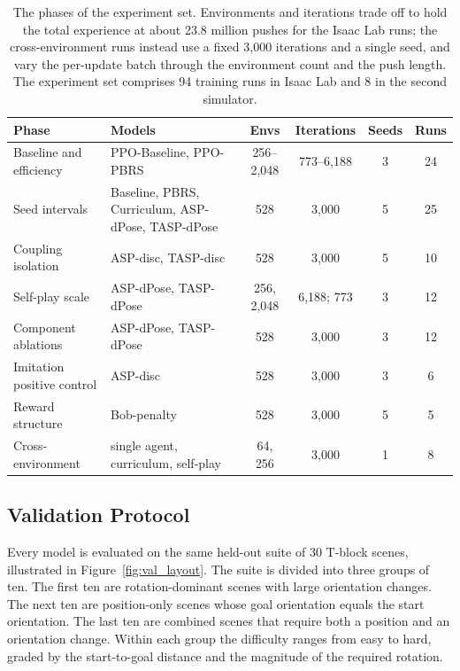 \begin{table}[H]
    \centering
    \small
    \begin{tabularx}{\textwidth}{l X c c c c}
        \hline
        \textbf{Phase} & \textbf{Models} & \textbf{Envs} & \textbf{Iterations} &
        \textbf{Seeds} & \textbf{Runs} \\
        \hline
        Baseline and efficiency & PPO-Baseline, PPO-PBRS & 256--2{,}048 &
        773--6{,}188 & 3 & 24 \\
        Seed intervals & Baseline, PBRS, Curriculum, ASP-dPose, TASP-dPose & 528 &
        3{,}000 & 5 & 25 \\
        Coupling isolation & ASP-disc, TASP-disc & 528 & 3{,}000 & 5 & 10 \\
        Self-play scale & ASP-dPose, TASP-dPose & 256, 2{,}048 & 6{,}188; 773 & 3 &
        12 \\
        Component ablations & ASP-dPose, TASP-dPose & 528 & 3{,}000 & 3 & 12 \\
        Imitation positive control & ASP-disc & 528 & 3{,}000 & 3 & 6 \\
        Reward structure & Bob-penalty & 528 & 3{,}000 & 5 & 5 \\
        Cross-environment & single agent, curriculum, self-play & 64, 256 &
        3{,}000 & 1 & 8 \\
        \hline
    \end{tabularx}
    \caption{The phases of the experiment set. Environments and iterations trade
    off to hold the total experience at about 23.8 million pushes for the Isaac Lab
    runs; the cross-environment runs instead use a fixed 3{,}000 iterations and a
    single seed, and vary the per-update batch through the environment count and
    the push length. The experiment set comprises 94 training runs in Isaac Lab and
    8 in the second simulator.}
    \label{tab:phases}
\end{table}

\subsection{Validation Protocol}
\label{sec:val_protocol}

Every model is evaluated on the same held-out suite of 30 T-block scenes,
illustrated in Figure~\ref{fig:val_layout}. The suite is divided into three groups
of ten. The first ten are rotation-dominant scenes with large orientation
changes. The next ten are position-only scenes whose goal orientation equals the
start orientation. The last ten are combined scenes that require both a position
and an orientation change. Within each group the difficulty ranges from easy to
hard, graded by the start-to-goal distance and the magnitude of the required
rotation.

